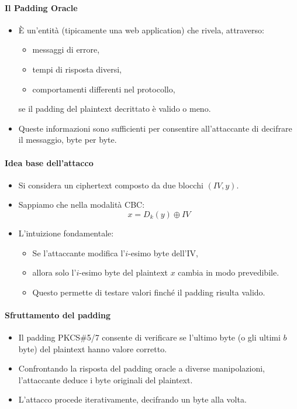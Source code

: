 \documentclass{report}
\begin{document}
\paragraph{Il Padding Oracle}
\begin{itemize}
    \item È un’entità (tipicamente una web application) che rivela, attraverso:
    \begin{itemize}
        \item messaggi di errore,
        \item tempi di risposta diversi,
        \item comportamenti differenti nel protocollo,
    \end{itemize}
    se il padding del plaintext decrittato è valido o meno.
    \item Queste informazioni sono sufficienti per consentire all’attaccante di decifrare il messaggio, byte per byte.
\end{itemize}

\paragraph{Idea base dell'attacco}
\begin{itemize}
    \item Si considera un ciphertext composto da due blocchi $(IV, y)$.
    \item Sappiamo che nella modalità CBC:
    \[
    x = D_k(y) \oplus IV
    \]
    \item L’intuizione fondamentale:
    \begin{itemize}
        \item Se l’attaccante modifica l’$i$-esimo byte dell’IV,
        \item allora solo l’$i$-esimo byte del plaintext $x$ cambia in modo prevedibile.
        \item Questo permette di testare valori finché il padding risulta valido.
    \end{itemize}
\end{itemize}

\paragraph{Sfruttamento del padding}
\begin{itemize}
    \item Il padding PKCS\#5/7 consente di verificare se l’ultimo byte (o gli ultimi $b$ byte) del plaintext hanno valore corretto.
    \item Confrontando la risposta del padding oracle a diverse manipolazioni, l’attaccante deduce i byte originali del plaintext.
    \item L’attacco procede iterativamente, decifrando un byte alla volta.
\end{itemize}
\end{document}
